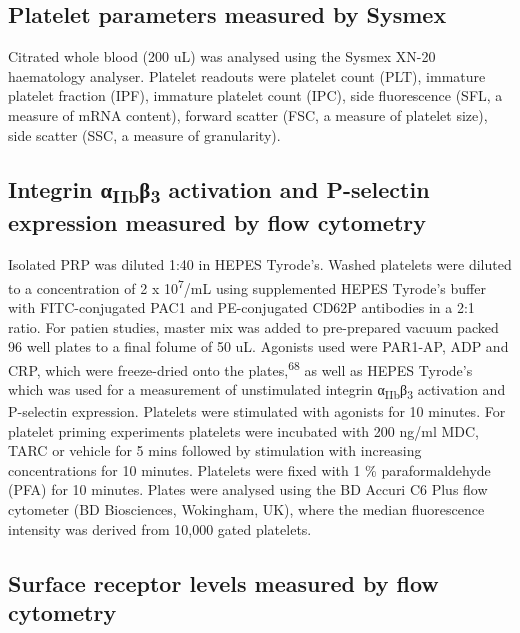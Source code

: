 \documentclass[11pt,twoside]{bristolthesis}
\begin{document}
\hypertarget{platelet-parameters-measured-by-sysmex}{%
\subsection{Platelet parameters measured by Sysmex}\label{platelet-parameters-measured-by-sysmex}}

Citrated whole blood (200 uL) was analysed using the Sysmex XN-20 haematology analyser. Platelet readouts were platelet count (PLT), immature platelet fraction (IPF), immature platelet count (IPC), side fluorescence (SFL, a measure of mRNA content), forward scatter (FSC, a measure of platelet size), side scatter (SSC, a measure of granularity).

\hypertarget{integrin-ux3b1iibux3b23-activation-and-p-selectin-expression-measured-by-flow-cytometry}{%
\subsection{\texorpdfstring{Integrin α\textsubscript{IIb}β\textsubscript{3} activation and P-selectin expression measured by flow cytometry}{Integrin αIIbβ3 activation and P-selectin expression measured by flow cytometry}}\label{integrin-ux3b1iibux3b23-activation-and-p-selectin-expression-measured-by-flow-cytometry}}

Isolated PRP was diluted 1:40 in HEPES Tyrode's. Washed platelets were diluted to a concentration of 2 x 10\textsuperscript{7}/mL using supplemented HEPES Tyrode's buffer with FITC-conjugated PAC1 and PE-conjugated CD62P antibodies in a 2:1 ratio. For patien studies, master mix was added to pre-prepared vacuum packed 96 well plates to a final folume of 50 uL. Agonists used were PAR1-AP, ADP and CRP, which were freeze-dried onto the plates,\textsuperscript{68} as well as HEPES Tyrode's which was used for a measurement of unstimulated integrin α\textsubscript{IIb}β\textsubscript{3} activation and P-selectin expression. Platelets were stimulated with agonists for 10 minutes. For platelet priming experiments platelets were incubated with 200 ng/ml MDC, TARC or vehicle for 5 mins followed by stimulation with increasing concentrations for 10 minutes. Platelets were fixed with 1 \% paraformaldehyde (PFA) for 10 minutes. Plates were analysed using the BD Accuri C6 Plus flow cytometer (BD Biosciences, Wokingham, UK), where the median fluorescence intensity was derived from 10,000 gated platelets.

\hypertarget{surface-receptor-levels-measured-by-flow-cytometry}{%
\subsection{Surface receptor levels measured by flow cytometry}\label{surface-receptor-levels-measured-by-flow-cytometry}}
\end{document}
